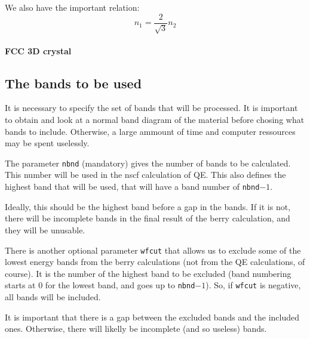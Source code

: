 \documentclass[a4paper,12pt]{report}
\begin{document}
We also have the important relation:
\begin{equation}
 n_1 = \dfrac{2}{\sqrt{3}} n_2
\end{equation}



\paragraph{FCC 3D crystal}











 \subsection{The bands to be used}

 It is necessary to specify the set of bands that will be processed.
 It is important to obtain and look at a normal band diagram of the material before chosing
 what bands to include.
 Otherwise, a large ammount of time and computer ressources may be spent uselessly.

 The parameter \verb|nbnd| (mandatory) gives the number of bands to be calculated.
 This number will be used in the nscf calculation of QE.
 This also defines the highest band that will be used, that will have a band number of \verb|nbnd|$-1$.

 Ideally, this should be the highest band before a gap in the bands.
 If it is not, there will be incomplete bands in the final result of the berry calculation,
 and they will be unusable.

 There is another optional parameter \verb|wfcut| that allows us to exclude some of the lowest energy bands
 from the berry calculations (not from the QE calculations, of course).
 It is the number of the highest band to be excluded
 (band numbering starts at 0 for the lowest band, and goes up to \verb|nbnd|$-1$).
 So, if \verb|wfcut| is negative, all bands will be included.

 It is important that there is a gap between the excluded bands and the included ones.
 Otherwise, there will likelly be incomplete (and so useless) bands.
\end{document}
